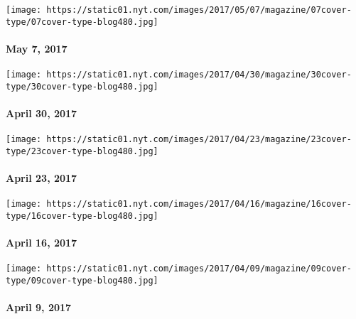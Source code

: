 \href{https://www.nytimes.com/issue/magazine/2017/05/05/magazine-index-20170507}{}

\texttt{[image: https://static01.nyt.com/images/2017/05/07/magazine/07cover-type/07cover-type-blog480.jpg]}

\hypertarget{may-7-2017}{%
\paragraph{May 7, 2017}\label{may-7-2017}}

\href{https://www.nytimes.com/issue/magazine/2017/04/28/magazine-index-20170430}{}

\texttt{[image: https://static01.nyt.com/images/2017/04/30/magazine/30cover-type/30cover-type-blog480.jpg]}

\hypertarget{april-30-2017}{%
\paragraph{April 30, 2017}\label{april-30-2017}}

\href{https://www.nytimes.com/issue/magazine/2017/04/21/magazine-index-20170423}{}

\texttt{[image: https://static01.nyt.com/images/2017/04/23/magazine/23cover-type/23cover-type-blog480.jpg]}

\hypertarget{april-23-2017}{%
\paragraph{April 23, 2017}\label{april-23-2017}}

\href{https://www.nytimes.com/issue/magazine/2017/04/14/magazine-index-20170416}{}

\texttt{[image: https://static01.nyt.com/images/2017/04/16/magazine/16cover-type/16cover-type-blog480.jpg]}

\hypertarget{april-16-2017}{%
\paragraph{April 16, 2017}\label{april-16-2017}}

\href{https://www.nytimes.com/issue/magazine/2017/04/07/magazine-index-20170409}{}

\texttt{[image: https://static01.nyt.com/images/2017/04/09/magazine/09cover-type/09cover-type-blog480.jpg]}

\hypertarget{april-9-2017}{%
\paragraph{April 9, 2017}\label{april-9-2017}}

